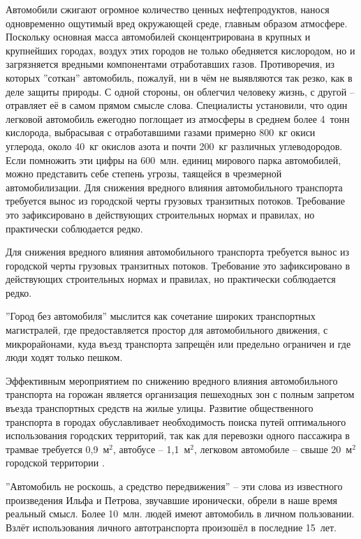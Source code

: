 Автомобили сжигают огромное количество ценных нефтепродуктов, нанося одновременно ощутимый вред окружающей среде, главным образом атмосфере. Поскольку основная масса автомобилей сконцентрирована в крупных и крупнейших городах, воздух этих городов не только обедняется кислородом, но и загрязняется вредными компонентами отработавших газов. Противоречия, из которых ''соткан'' автомобиль, пожалуй, ни в чём не выявляются так резко, как в деле защиты природы. С одной стороны, он облегчил человеку жизнь, с другой – отравляет её в самом прямом смысле слова. Специалисты установили, что один легковой автомобиль ежегодно поглощает из атмосферы в среднем более 4~тонн кислорода, выбрасывая с отработавшими газами примерно 800~кг окиси углерода, около 40~кг окислов азота и почти 200~кг различных углеводородов. Если помножить эти цифры на 600~млн. единиц мирового парка автомобилей, можно представить себе степень угрозы, таящейся в чрезмерной автомобилизации.
Для снижения вредного влияния автомобильного транспорта требуется вынос из городской черты грузовых транзитных потоков. Требование это зафиксировано в действующих строительных нормах и правилах, но практически соблюдается редко.

Для снижения вредного влияния автомобильного транспорта требуется вынос из городской черты грузовых транзитных потоков. Требование это зафиксировано в действующих строительных нормах и правилах, но практически соблюдается редко.

''Город без автомобиля'' мыслится как сочетание широких транспортных магистралей, где предоставляется простор для автомобильного движения, с микрорайонами, куда въезд транспорта запрещён или предельно ограничен и где люди ходят только пешком.

Эффективным мероприятием по снижению вредного влияния автомобильного транспорта на горожан является организация пешеходных зон с полным запретом въезда транспортных средств на жилые улицы. Развитие общественного транспорта в городах обуславливает необходимость поиска путей оптимального использования городских территорий, так как для перевозки одного пассажира в трамвае требуется 0,9~м$^2$, автобусе – 1,1~м$^2$, легковом автомобиле – свыше 20~м$^2$ городской территории \cite{golubev}.

''Автомобиль не роскошь, а средство передвижения'' – эти слова из известного произведения Ильфа и Петрова, звучавшие иронически, обрели в наше время реальный смысл. Более 10~млн. людей имеют автомобиль в личном пользовании. Взлёт использования личного автотранспорта произошёл в последние 15~лет.





